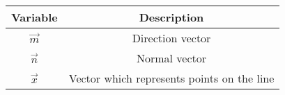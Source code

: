 \begin{tabular}[12pt]{ |c|c|}
    \hline
    \textbf{Variable} & \textbf{Description}\\ 
    \hline
    $\vec{m}$ & Direction vector\\
    \hline
    $\vec{n}$ & Normal vector\\
    \hline
    $\vec{x}$ & Vector which represents points on the line\\
    \hline
\end{tabular}
